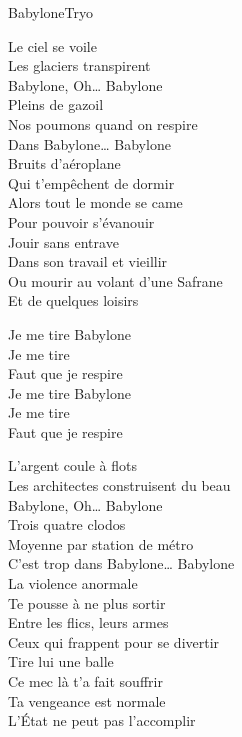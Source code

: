 \begin{Song}{Babylone}{Tryo}
\begin{multicols}{2}

\begin{Verse}
Le ciel se voile\\
Les glaciers transpirent\\
Babylone, Oh… Babylone\\
Pleins de gazoil\\
Nos poumons quand on respire\\
Dans Babylone… Babylone\\
Bruits d'aéroplane\\
Qui t'empêchent de dormir\\
Alors tout le monde se came\\
Pour pouvoir s'évanouir\\
Jouir sans entrave\\
Dans son travail et vieillir\\
Ou mourir au volant d'une Safrane\\
Et de quelques loisirs\\
\end{Verse}
\espaceInterStrophe

\begin{Chorus}
Je me tire  Babylone\\
Je me tire \\
Faut que je respire\\
Je me tire  Babylone\\
Je me tire \\
Faut que je respire\\
\end{Chorus}
\espaceInterStrophe

\begin{Verse}
L'argent coule à flots\\
Les architectes construisent du beau\\
Babylone, Oh… Babylone\\
Trois quatre clodos\\
Moyenne par station de métro\\
C'est trop dans Babylone… Babylone\\
La violence anormale\\
Te pousse à ne plus sortir\\
Entre les flics, leurs armes\\
Ceux qui frappent pour se divertir\\
Tire lui une balle\\
Ce mec là t'a fait souffrir\\
Ta vengeance est normale\\
L'État ne peut pas l'accomplir\\
\end{Verse}
\espaceInterStrophe


\end{multicols}
\end{Song}
